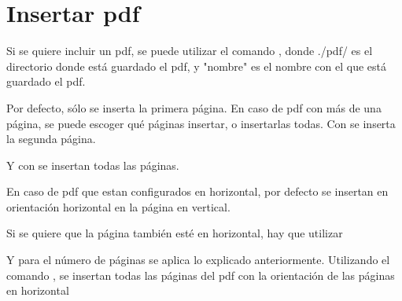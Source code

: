 \chapter{Insertar pdf}

Si se quiere incluir un pdf, se puede utilizar el comando \verb!!, donde ./pdf/ es el directorio donde está guardado el pdf, y "nombre" es el nombre con el que está guardado el pdf.



Por defecto, sólo se inserta la primera página. En caso de pdf con más de una página, se puede escoger qué páginas insertar, o insertarlas todas. Con \verb!! se inserta la segunda página.



Y con \verb!! se insertan todas las páginas.



En caso de pdf que estan configurados en horizontal, por defecto se insertan en orientación horizontal en la página en vertical.



Si se quiere que la página también esté en horizontal, hay que utilizar \verb!!



Y para el número de páginas se aplica lo explicado anteriormente. Utilizando el comando \verb!!, se insertan todas las páginas del pdf con la orientación de las páginas en horizontal

